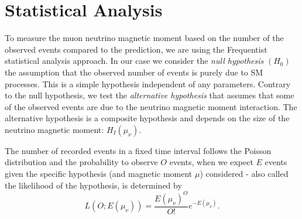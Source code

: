 \section{Statistical Analysis}\label{sec:NuMMStatisticalAnalysis}

To measure the muon neutrino magnetic moment based on the number of the observed events compared to the prediction, we are using the Frequentist statistical analysis approach. In our case we consider the \textit{null hypothesis} $\left(H_0\right)$ the assumption that the observed number of events is purely due to \gls{SM} processes. This is a simple hypothesis independent of any parameters. Contrary to the null hypothesis, we test the \textit{alternative hypothesis} that assumes that some of the observed events are due to the neutrino magnetic moment interaction. The alternative hypothesis is a composite hypothesis and depends on the size of the neutrino magnetic moment: $H_I\left(\mu_\nu\right)$.

The number of recorded events in a fixed time interval follows the Poisson distribution and the probability to observe $O$ events, when we expect $E$ events given the specific hypothesis (and magnetic moment $\mu$) considered - also called the likelihood of the hypothesis, is determined by
\begin{equation}
L\left(O;E\left(\mu_\nu\right)\right)=\frac{E\left(\mu_\nu\right)^{O}}{O!}e^{-E\left(\mu_\nu\right)}.
\end{equation}

